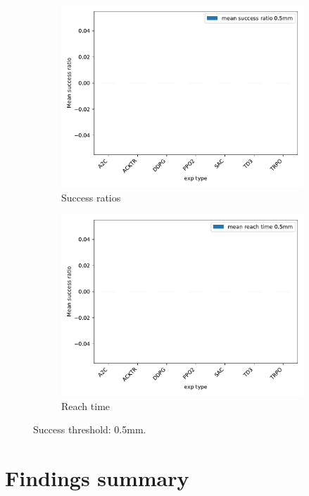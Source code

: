 \documentclass{article}
\begin{document}
\begin{figure}[H]
\centering
\begin{subfigure}{0.49\textwidth}
  \centering
  \includegraphics[width=\textwidth]{../success_0.5mm.pdf}
  \caption{Success ratios} 
\end{subfigure}
\begin{subfigure}{0.49\textwidth}
  \centering
  \includegraphics[width=\textwidth]{../reachtime_0.5mm.pdf} 
  \caption{Reach time}
\end{subfigure}
\caption{Success threshold: 0.5mm.}
\end{figure}




\section{Findings summary}
\end{document}
